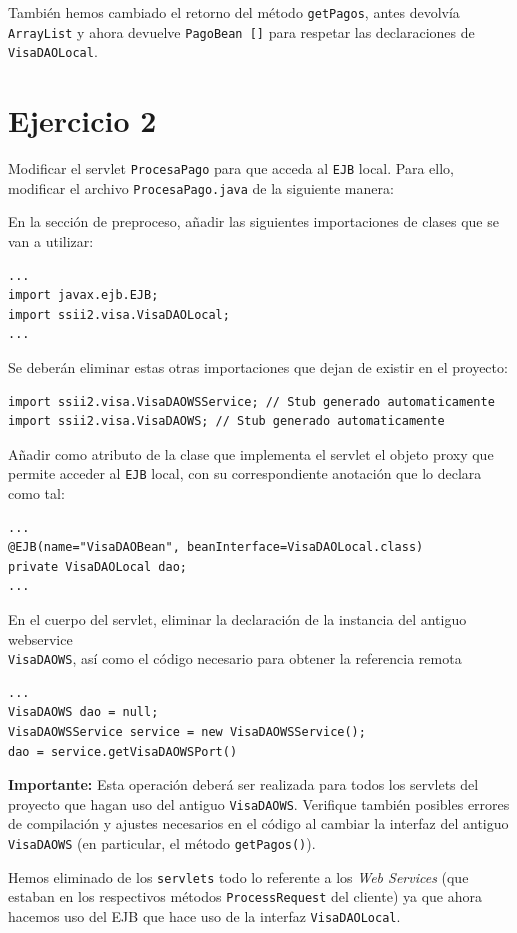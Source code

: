 \documentclass[a4paper, 10pt]{article}
\begin{document}
	También hemos cambiado el retorno del método \texttt{getPagos}, antes devolvía \texttt{ArrayList} y ahora devuelve \texttt{PagoBean []} para respetar las declaraciones de \texttt{VisaDAOLocal}.

	\section{Ejercicio 2}
	\begin{mdframed}
Modificar el servlet \texttt{ProcesaPago} para que acceda al \texttt{EJB} local. Para ello, modificar el archivo
\texttt{ProcesaPago.java} de la siguiente manera:

En la sección de preproceso, añadir las siguientes importaciones de clases que se van a utilizar:

\lstset{language=java}
\begin{lstlisting}
...
import javax.ejb.EJB;
import ssii2.visa.VisaDAOLocal;
...
\end{lstlisting}
Se deberán eliminar estas otras importaciones que dejan de existir en el proyecto:
\begin{lstlisting}
import ssii2.visa.VisaDAOWSService; // Stub generado automaticamente
import ssii2.visa.VisaDAOWS; // Stub generado automaticamente
\end{lstlisting}
Añadir como atributo de la clase que implementa el servlet el objeto proxy que permite acceder al \texttt{EJB}
local, con su correspondiente anotación que lo declara como tal:
\begin{lstlisting}
...
@EJB(name="VisaDAOBean", beanInterface=VisaDAOLocal.class)
private VisaDAOLocal dao;
...
\end{lstlisting}
En el cuerpo del servlet, eliminar la declaración de la instancia del antiguo webservice \\ \texttt{VisaDAOWS}, así
como el código necesario para obtener la referencia remota
\begin{lstlisting}
...
VisaDAOWS dao = null;
VisaDAOWSService service = new VisaDAOWSService();
dao = service.getVisaDAOWSPort()
\end{lstlisting}

\textbf{Importante:} Esta operación deberá ser realizada para todos los servlets del proyecto que hagan uso del
antiguo \texttt{VisaDAOWS}. Verifique también posibles errores de compilación y ajustes necesarios en el código
al cambiar la interfaz del antiguo \texttt{VisaDAOWS} (en particular, el método \texttt{getPagos()}).
\end{mdframed}
	Hemos eliminado de los \texttt{servlets} todo lo referente a los \textit{Web Services} (que estaban en los respectivos métodos \texttt{ProcessRequest} del cliente) ya que ahora hacemos uso del EJB que hace uso de la interfaz \texttt{VisaDAOLocal}.
\end{document}
